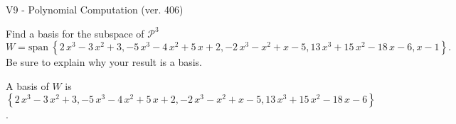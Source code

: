 \begin{exercise}
  \begin{exerciseTitle}V9 - Polynomial Computation (ver. 406)\end{exerciseTitle}
  \begin{exerciseStatement}
    Find a basis for the subspace of \(\mathcal{P}^3\) 
\[W=\mathrm{span}\ \left\{2 \, x^{3} - 3 \, x^{2} + 3 , -5 \, x^{3} - 4 \, x^{2} + 5 \, x + 2 , -2 \, x^{3} - x^{2} + x - 5 , 13 \, x^{3} + 15 \, x^{2} - 18 \, x - 6 , x - 1\right\}.\]
 Be sure to explain why your result is a basis.


  \end{exerciseStatement}
  \begin{exerciseAnswer}
   A basis of \(W\) is  \(\left\{2 \, x^{3} - 3 \, x^{2} + 3 , -5 \, x^{3} - 4 \, x^{2} + 5 \, x + 2 , -2 \, x^{3} - x^{2} + x - 5 , 13 \, x^{3} + 15 \, x^{2} - 18 \, x - 6\right\}\).
  


  \end{exerciseAnswer}
\end{exercise}